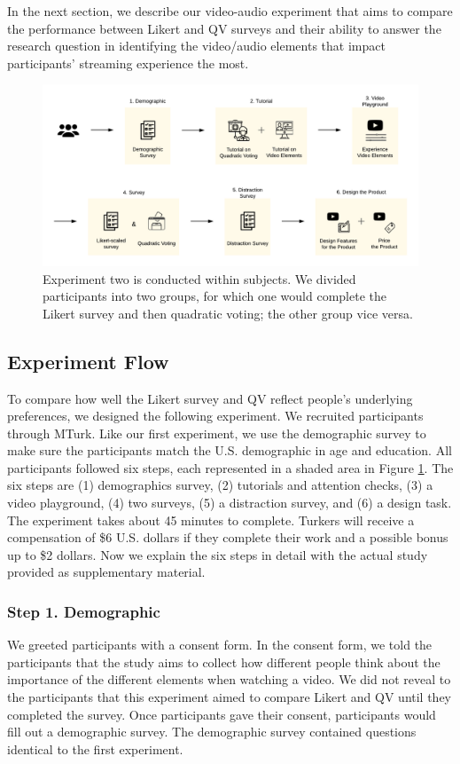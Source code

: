 In the next section, we describe our video-audio experiment that aims to compare the performance between Likert and QV surveys and their ability to answer the research question in identifying the video/audio elements that impact participants' streaming experience the most.

\begin{figure}[htpb]
    \centering
    \includegraphics[width=\textwidth, keepaspectratio=true]{content/image/exp2_procedure.pdf}
    \caption{
        Experiment two is conducted within subjects. We divided participants into two groups, for which one would complete the Likert survey and then quadratic voting; the other group vice versa.
    }
    \label{fig:exp2_flow}
\end{figure}

\subsection{Experiment Flow}

To compare how well the Likert survey and QV reflect people's underlying preferences, we designed the following experiment. We recruited participants through MTurk. Like our first experiment, we use the demographic survey to make sure the participants match the U.S. demographic in age and education. All participants followed six steps, each represented in a shaded area in Figure \ref{fig:exp2_flow}. The six steps are (1) demographics survey, (2) tutorials and attention checks, (3) a video playground, (4) two surveys, (5) a distraction survey, and (6) a design task. The experiment takes about 45 minutes to complete. Turkers will receive a compensation of \$6 U.S. dollars if they complete their work and a possible bonus up to \$2 dollars. Now we explain the six steps in detail with the actual study provided as supplementary material.

\subsubsection{Step 1. Demographic}
We greeted participants with a consent form. In the consent form, we told the participants that the study aims to collect how different people think about the importance of the different elements when watching a video. We did not reveal to the participants that this experiment aimed to compare Likert and QV until they completed the survey. Once participants gave their consent, participants would fill out a demographic survey. The demographic survey contained questions identical to the first experiment.

